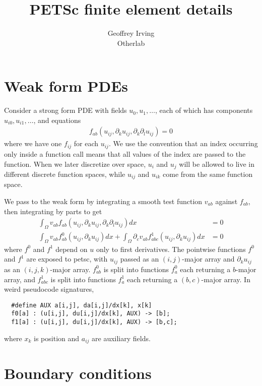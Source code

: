 \documentclass[11pt]{article}
\newcommand{\p}[1]{\partial_{#1}}
\begin{document}
\title{PETSc finite element details}
\author{Geoffrey Irving \\ Otherlab}
\maketitle

\section{Weak form PDEs}

Consider a strong form PDE with fields $u_0, u_1, \ldots$, each of which has components
$u_{i0}, u_{i1}, \ldots$, and equations
\begin{align*}
  f_{ab}\left(u_{ij}, \p{k} u_{ij}, \p{k}\p{l} u_{ij}\right) = 0
\end{align*}
where we have one $f_{ij}$ for each $u_{ij}$.  We use the convention that an index occurring
only inside a function call means that all values of the index are passed to the function.  When
we later discretize over space, $u_i$ and $u_j$ will be allowed to live in different discrete
function spaces, while $u_{ij}$ and $u_{ik}$ come from the same function space.

We pass to the weak form by integrating a smooth test function $v_{ab}$ against $f_{ab}$, then
integrating by parts to get
\begin{align*}
  \int_{\Omega} v_{ab} f_{ab} \left(u_{ij}, \p{k} u_{ij}, \p{k}\p{l} u_{ij} \right) dx &= 0 \\
  \int_{\Omega} v_{ab} f^0_{ab} \left(u_{ij}, \p{k} u_{ij} \right) dx
    + \int_{\Omega} \p{c} v_{ab} f^1_{abc} \left(u_{ij}, \p{k} u_{ij} \right) dx &= 0
\end{align*}
where $f^0$ and $f^1$ depend on $u$ only to first derivatives.  The pointwise functions $f^0$
and $f^1$ are exposed to petsc, with $u_{ij}$ passed as an $(i,j)$-major array and
$\p{k} u_{ij}$ as an $(i,j,k)$-major array.  $f^0_{ab}$ is split into functions $f^0_a$ each
returning a $b$-major array, and $f^1_{abc}$ is split into functions $f^1_a$ each returning
a $(b,c)$-major array.  In weird pseudocode signatures,
\begin{verbatim}
  #define AUX a[i,j], da[i,j]/dx[k], x[k]
  f0[a] : (u[i,j], du[i,j]/dx[k], AUX) -> [b];
  f1[a] : (u[i,j], du[i,j]/dx[k], AUX) -> [b,c];
\end{verbatim}
where $x_k$ is position and $a_{ij}$ are auxiliary fields.

\section{Boundary conditions}
\end{document}
